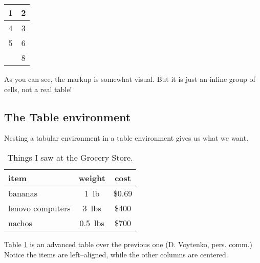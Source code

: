 \documentclass[12pt]{article}
\begin{document}
\begin{tabular}{|c||c||||||||||||||||} %
\hline  1 & 2 \\ %
\hline 4 & 3 \\ %
5 & 6\\ %
 & 8 \\ %
\hline
\end{tabular}
As you can see, the markup is somewhat visual. But it is just an inline group of cells, not a real table!

\subsection{The Table environment}

Nesting a tabular environment in a table environment gives us what we want.

\begin{table}[h] %
	\centering %
	\caption{Things I saw at the Grocery Store.} %
	\begin{tabular}{l c c} %
		\hline item & weight & cost\\
		\hline bananas & 1~lb & \$0.69\\
		lenovo computers & 3~lbs & \$400\\
		nachos & 0.5~lbs & \$700\\
		\hline
	\end{tabular}
	\label{tab:grocery} %
\end{table}

Table \ref{tab:grocery} is an advanced table over the previous one (D. Voytenko, pers. comm.) Notice the items are left--aligned, while the other columns are centered.
\end{document}
